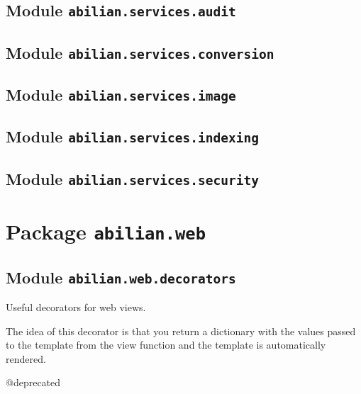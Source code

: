 \documentclass[a4paper,12pt,english]{sphinxmanual}
\begin{document}
\subsection{Module \texttt{abilian.services.audit}}
\label{api:module-abilian-services-audit}

\subsection{Module \texttt{abilian.services.conversion}}
\label{api:module-abilian-services-conversion}

\subsection{Module \texttt{abilian.services.image}}
\label{api:module-abilian-services-image}

\subsection{Module \texttt{abilian.services.indexing}}
\label{api:module-abilian-services-indexing}

\subsection{Module \texttt{abilian.services.security}}
\label{api:module-abilian-services-security}

\section{Package \texttt{abilian.web}}
\label{api:package-abilian-web}

\subsection{Module \texttt{abilian.web.decorators}}
\label{api:module-abilian.web.decorators}\label{api:module-abilian-web-decorators}
Useful decorators for web views.

\begin{fulllineitems}
\label{api:abilian.web.decorators.templated}
The idea of this decorator is that you return a dictionary with the values
passed to the template from the view function and the template
is automatically rendered.

@deprecated

\end{fulllineitems}
\end{document}
